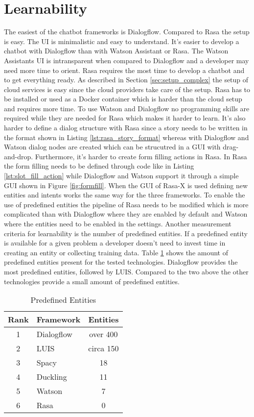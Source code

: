 \section*{Learnability}
The easiest of the chatbot frameworks is Dialogflow.
Compared to Rasa the setup is easy.
The UI is minimalistic and easy to understand.
It's easier to develop a chatbot with Dialogflow than with Watson Assistant or Rasa.
The Watson Assistants UI is intransparent when compared to Dialogflow and a developer 
may need more time to orient.
Rasa requires the most time to develop a chatbot and to get everything ready.
As described in Section \ref{sec:setup_complex} the setup of cloud services is 
easy since the cloud providers take care of the setup.
Rasa has to be installed or used as a Docker container which is harder than the cloud 
setup and requires more time.
To use Watson and Dialogflow no programming skills are required while they are needed for 
Rasa which makes it harder to learn.
It's also harder to define a dialog structure with Rasa since a story 
needs to be written in the format shown in Listing \ref{lst:rasa_story_format}
whereas with Dialogflow and Watson dialog nodes are created which 
can be strucutred in a GUI with drag-and-drop.
Furthermore, it's harder to create form filling actions in Rasa.
In Rasa the form filling needs to be defined through code like in Listing \ref{lst:slot_fill_action} while 
Dialogflow and Watson support it through a simple GUI shown in Figure \ref{fig:formfill}.
When the GUI of Rasa-X is used defining new entities and intents works the same way for the three frameworks.
To enable the use of predefined entities the pipeline of Rasa needs to be modified which is more 
complicated than with Dialogflow where they are enabled by default and Watson where the entities need to be 
enabled in the settings.
Another measurement criteria for learnability is the number of predefined entities.
If a predefined entity is available for a given problem a developer doesn't need to 
invest time in creating an entity or collecting training data. 
Table \ref{tab:predefined_entities} shows the amount of predefined entities 
present for the tested technologies.
Dialogflow provides the most predefined entities, followed by LUIS.
Compared to the two above the other technologies provide a small amount of predefined entities.
\begin{table}[H]
    \centering
    \begin{tabular}{ c | l | c }
        Rank & Framework &  Entities \\ \hline \hline
        1 & \multirow{1}{*}{Dialogflow} & over 400 \\
        2 & \multirow{1}{*}{LUIS} & circa 150 \\
        3 & \multirow{1}{*}{Spacy} & 18 \\
        4 & \multirow{1}{*}{Duckling} & 11 \\
        5 & \multirow{1}{*}{Watson} & 7  \\
        6 & \multirow{1}{*}{Rasa} & 0 \\
    \end{tabular}
    \caption{Predefined Entities} \label{tab:predefined_entities}
\end{table} \noindent

